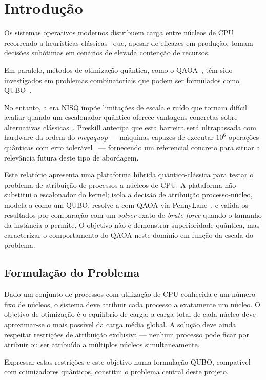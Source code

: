 \chapter{Introdução}
\label{chap:introducao}

Os sistemas operativos modernos distribuem carga entre núcleos de \ac{CPU} recorrendo a heurísticas clássicas~\cite{LinuxCFS}
que, apesar de eficazes em produção, tomam decisões subótimas em cenários de elevada contenção de recursos.

Em paralelo, métodos de otimização quântica, como o \ac{QAOA}~\cite{Farhi2014QAOA},
têm sido investigados em problemas combinatoriais que podem ser formulados como
\ac{QUBO}~\cite{Kochenberger2014QUBO,Glover2019QUBO}.
 
No entanto, a era \ac{NISQ} impõe limitações de escala e ruído que
tornam difícil avaliar quando um escalonador quântico oferece vantagens concretas sobre alternativas
clássicas~\cite{Preskill2018}. Preskill antecipa que esta barreira será ultrapassada com hardware da ordem
do \textit{megaquop} --- máquinas capazes de executar $10^6$ operações quânticas com erro
tolerável~\cite{Preskill2025} --- fornecendo um referencial concreto para situar a relevância futura
deste tipo de abordagem.

Este relatório apresenta uma plataforma híbrida quântico-clássica para testar o problema
de atribuição de processos a núcleos de \acs{CPU}. A plataforma não substitui o
escalonador do kernel; isola a decisão de atribuição processo-núcleo,
modela-a como um \acs{QUBO}, resolve-a com \acs{QAOA} via PennyLane~\cite{Bergholm2018PennyLane},
e valida os resultados por comparação com um \textit{solver} exato de \textit{brute force}
quando o tamanho da instância o permite. O objetivo não é demonstrar superioridade
quântica, mas caracterizar o comportamento do \acs{QAOA} neste domínio em função da
escala do problema.

\section{Formulação do Problema}
\label{sec:formulacao-problema}

Dado um conjunto de processos com utilização de \acs{CPU} conhecida e um número fixo de núcleos, o sistema deve
atribuir cada processo a exatamente um núcleo. O objetivo de otimização é o equilíbrio de carga: a carga
total de cada núcleo deve aproximar-se o mais possível da carga média global. A solução deve ainda respeitar
restrições de atribuição exclusiva --- nenhum processo pode ficar por atribuir ou ser atribuído a múltiplos
núcleos simultaneamente.

Expressar estas restrições e este objetivo numa formulação \acs{QUBO}, compatível com otimizadores quânticos,
constitui o problema central deste projeto.

